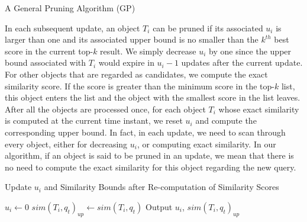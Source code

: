  \begin{algorithm2e}[t]
\SetAlgoLined%
 \caption{A General Pruning Algorithm (GP)}
 \label{GPmain}
\end{algorithm2e} 

In each subsequent update, an object $T_i$ can be pruned if its associated $u_i$ is larger than one and its associated upper bound is no smaller than the $k^{th}$ best score in the current top-$k$ result. We simply decrease $u_i$ by one since the upper bound associated with $T_i$ would expire in $u_i - 1$ updates after the current update. For other objects that are regarded as candidates, we compute the exact similarity score. If the score is greater than the minimum score in the top-$k$ list, this object enters the list and the object with the smallest score in the list leaves. After all the objects are processed once, for each object $T_i$ whose exact similarity is computed at the current time instant, we reset $u_i$ and compute the corresponding upper bound. In fact, in each update, we need to scan through every object, either for decreasing $u_i$, or computing exact similarity. In our algorithm, if an object is said to be pruned in an update, we mean that there is no need to compute the exact similarity for this object regarding the new query.   

\begin{algorithm2e}[t]
 \SetAlgoLined%
 \caption{Update $u_i$ and Similarity Bounds after Re-computation of Similarity Scores}
\label{GPsub}
 
  {$u_i \gets 0$\; $sim(T_i, q_t)_{up} \gets sim(T_i, q_t)$\;}
  Output $u_i$, $sim(T_i, q_t)_{up}$\;
 \end{algorithm2e}
 

